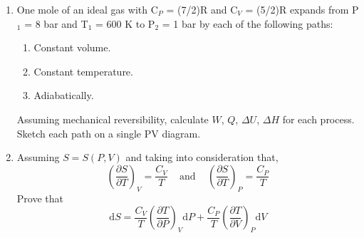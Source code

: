 \documentclass[12pts,a4paper,amsmath,amssymb,floatfix]{article}%
\renewcommand{\d}{\mathrm{d}}
\newcommand{\frc}{\displaystyle\frac}
\begin{document}
\begin{enumerate}[label=\bfseries Problem \arabic*:]
\item\label{Tut02:IdealGas2} One mole of an ideal gas with C$_{P}$ = (7/2)R and C$_{V}$ = (5/2)R expands from P$_{1}$ = 8 bar and T$_{1}$ = 600 K to P$_{2}$ = 1 bar by each of the following paths:
\begin{enumerate}
\item Constant volume.%
\item Constant temperature.%
\item Adiabatically.%
\end{enumerate}
Assuming mechanical reversibility, calculate $W$, $Q$, $\Delta U$, $\Delta H$ for each process. Sketch each path on a single PV diagram.

\begin{comment}
\item\label{Tut02:Carnot}A Carnot engine receives 250 kJ.s$^{-1}$ of heat from a heat-source reservoir at 525$^{\circ}$C and rejects heat to a heat-sink reservoir at 50$^{\circ}$C. What are the power developed and the heat rejected?%

\item\label{Tut02:IdealGas3}An ideal gas at 2500 kPa is throttled adiabatically to 150 kPa at the rate of 20 gmol.s$^{-1}$. Determine the rate of entropy generation if the surrounding temperature is T$_{0}$ = 300 K. %


\item\label{Tut02:CylinderPiston2}One kilogram of water $\left(\text{V}_{1} = \text{1003 cm}^{3}\text{.kg}^{-1}\right)$ in a piston/cylinder device at 25$^{\circ}$C and 1 bar is compressed in a mechanically reversible, isothermal process to 1500 bar. Determine $Q$, $W$, $\Delta U$, $\Delta H$ and $\Delta S$ given that $\beta$ = 250$\times$10$^{-6}$ K$^{-1}$ and $\kappa$ = 45$\times$10$^{-6}$ bar$^{-1}$. A satisfactory assumption is that $V$ is at its arithmetic average value. As a $PVT$ equation of state use:%
\begin{displaymath}
\displaystyle\frac{\d V}{V} = \beta \d T - \kappa \d P
\end{displaymath}
\end{comment}

\item\label{Tut02:Demonstration}Assuming $S = S\left(P,V\right)$ and taking into consideration that,
\begin{displaymath}
\left(\frc{\partial S}{\partial T}\right)_{V} = \frc{C_{V}}{T}\;\;\;\text{ and }\;\;\; \left(\frc{\partial S}{\partial T}\right)_{P} = \frc{C_{P}}{T}
\end{displaymath}
Prove that 
\begin{displaymath}
\d S = \frc{C_{V}}{T}\left(\frc{\partial T}{\partial P}\right)_{V}\d P + \frc{C_{P}}{T}\left(\frc{\partial T}{\partial V}\right)_{P}\d V
\end{displaymath}



\end{enumerate}
\end{document}
